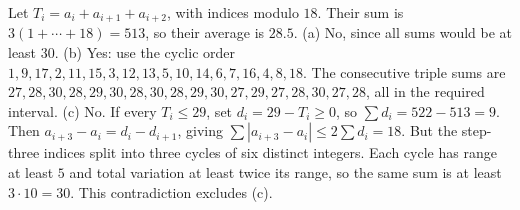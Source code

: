 Let $T_i=a_i+a_{i+1}+a_{i+2}$, with indices modulo $18$. Their sum is $3(1+\cdots+18)=513$, so their average is $28.5$. (a) No, since all sums would be at least $30$. (b) Yes: use the cyclic order $1,9,17,2,11,15,3,12,13,5,10,14,6,7,16,4,8,18$. The consecutive triple sums are $27,28,30,28,29,30,28,30,28,29,30,27,29,27,28,30,27,28$, all in the required interval. (c) No. If every $T_i\le29$, set $d_i=29-T_i\ge0$, so $\sum d_i=522-513=9$. Then $a_{i+3}-a_i=d_i-d_{i+1}$, giving $\sum|a_{i+3}-a_i|\le2\sum d_i=18$. But the step-three indices split into three cycles of six distinct integers. Each cycle has range at least $5$ and total variation at least twice its range, so the same sum is at least $3\cdot10=30$. This contradiction excludes (c).
